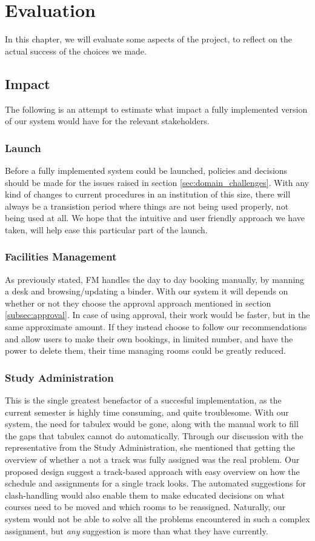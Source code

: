 \chapter{Evaluation}
\label{chap:evaluation}
In this chapter, we will evaluate some aspects of the project, to reflect on the actual success of the choices we made.

\section{Impact}
\label{sec:impact}
The following is an attempt to estimate what impact a fully implemented version of our system would have for the relevant stakeholders.

\subsection{Launch}
Before a fully implemented system could be launched, policies and decisions should be made for the issues raised in section \ref{sec:domain_challenges}.
With any kind of changes to current procedures in an institution of this size, there will always be a transistion period where things are not being used properly, not being used at all. We hope that the intuitive and user friendly approach we have taken, will help ease this particular part of the launch.

\subsection{Facilities Management}
As previously stated, FM handles the day to day booking manually, by manning a desk and browsing/updating a binder.
With our system it will depends on whether or not they choose the approval approach mentioned in section \ref{subsec:approval}.
In case of using approval, their work would be faster, but in the same approximate amount.
If they instead choose to follow our recommendations and allow users to make their own bookings, in limited number, and have the power to delete them, their time managing rooms could be greatly reduced.

\subsection{Study Administration}
This is the single greatest benefactor of a succesful implementation, as the current semester is highly time consuming, and quite troublesome. With our system, the need for tabulex would be gone, along with the manual work to fill the gaps that tabulex cannot do automatically. Through our discussion with the representative from the Study Administration, she mentioned that getting the overview of whether a not a track was fully assigned was the real problem. Our proposed design suggest a track-based approach with easy overview on how the schedule and assignments for a single track looks. The automated suggestions for clash-handling would also enable them to make educated decisions on what courses need to be moved and which rooms to be reassigned. Naturally, our system would not be able to solve all the problems encountered in such a complex assignment, but \emph{any} suggestion is more than what they have currently.

